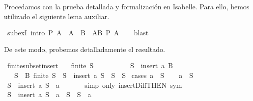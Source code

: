 \begin{isabellebody}
\begin{isamarkuptext}
  Procedamos con la prueba detallada y formalización en Isabelle. Para ello, hemos utilizado el
  siguiente lema auxiliar.%
\end{isamarkuptext}\isamarkuptrue%
\isamarkupfalse%
\ subexI\ {\isacharbrackleft}intro{\isacharbrackright}{\isacharcolon}\ {\isachardoublequoteopen}P\ A\ {\isasymLongrightarrow}\ A\ {\isasymsubseteq}\ B\ {\isasymLongrightarrow}\ {\isasymexists}A{\isasymsubseteq}B{\isachardot}\ P\ A{\isachardoublequoteclose}\isanewline
%
\isadelimproof
\ \ %
\endisadelimproof
%
\isatagproof
{}\isamarkupfalse%
\ blast%
\endisatagproof
{\isafoldproof}%
%
\isadelimproof
%
\endisadelimproof
%
\begin{isamarkuptext}%
De este modo, probemos detalladamente el resultado.%
\end{isamarkuptext}\isamarkuptrue%
\isamarkupfalse%
\ finite{\isacharunderscore}subset{\isacharunderscore}insert{}{\isacharcolon}\isanewline
\ \ \ {\isachardoublequoteopen}finite\ S{\isachardoublequoteclose}\isanewline
\ \ \ \ \ \ \ \ \ \ {\isachardoublequoteopen}S\ {\isasymsubseteq}\ insert\ a\ B{\isachardoublequoteclose}\isanewline
\ \ \ {\isachardoublequoteopen}{\isasymexists}S{\isacharprime}\ {\isasymsubseteq}\ B{\isachardot}\ finite\ S{\isacharprime}\ {\isasymand}\ {\isacharparenleft}S\ {\isacharequal}\ insert\ a\ S{\isacharprime}\ {\isasymor}\ S\ {\isacharequal}\ S{\isacharprime}{\isacharparenright}{\isachardoublequoteclose}\isanewline
%
\isadelimproof
%
\endisadelimproof
%
\isatagproof
{}\isamarkupfalse%
\ {\isacharparenleft}cases\ {\isachardoublequoteopen}a\ {\isasymin}\ S{\isachardoublequoteclose}{\isacharparenright}\isanewline
\ \ \isamarkupfalse%
\ {\isachardoublequoteopen}a\ {\isasymin}\ S{\isachardoublequoteclose}\isanewline
\ \ \isamarkupfalse%
\ \isamarkupfalse%
\ {\isachardoublequoteopen}S\ {\isacharequal}\ insert\ a\ {\isacharparenleft}S\ {\isacharminus}\ {\isacharbraceleft}a{\isacharbraceright}{\isacharparenright}{\isachardoublequoteclose}\ \isanewline
\ \ \ \ \isamarkupfalse%
\ {\isacharparenleft}simp\ only{\isacharcolon}\ insert{\isacharunderscore}Diff{\isacharbrackleft}THEN\ sym{\isacharbrackright}{\isacharparenright}\isanewline
\ \ \isamarkupfalse%
\ \isamarkupfalse%
\ {}{\isacharcolon}{\isachardoublequoteopen}S\ {\isacharequal}\ insert\ a\ {\isacharparenleft}S\ {\isacharminus}\ {\isacharbraceleft}a{\isacharbraceright}{\isacharparenright}\ {\isasymor}\ S\ {\isacharequal}\ S\ {\isacharminus}\ {\isacharbraceleft}a{\isacharbraceright}{\isachardoublequoteclose}\isanewline

\end{isabellebody}

